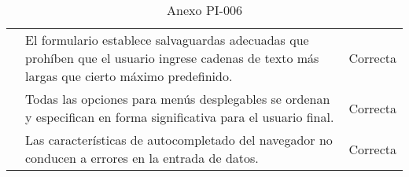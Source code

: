 \begin{table}[htpb]
\begin{tabularx}{\textwidth}{|l|X|l|}
                                                                    & El formulario establece salvaguardas adecuadas que prohíben que el usuario ingrese cadenas de texto más largas que cierto máximo predefinido.             & Correcta            \\ \cline{2-3} 
                                                                    & Todas las opciones para menús desplegables se ordenan y especifican en forma significativa para el usuario final.                                         & Correcta            \\ \cline{2-3} 
                                                                    & Las características de autocompletado del navegador no conducen a errores en la entrada de datos.                                                         & Correcta            \\ \hline
\end{tabularx}
\caption{Anexo PI-006}
\end{table}


